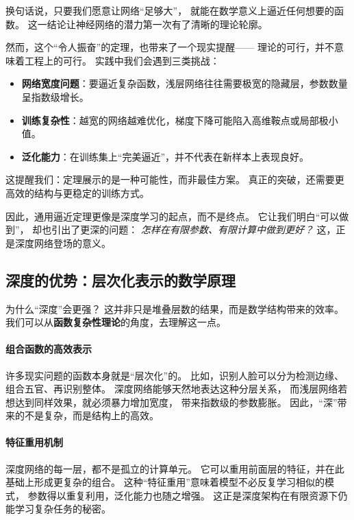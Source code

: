 换句话说，只要我们愿意让网络“足够大”，  
就能在数学意义上逼近任何想要的函数。  
这一结论让神经网络的潜力第一次有了清晰的理论轮廓。

然而，这个“令人振奋”的定理，也带来了一个现实提醒——  
理论的可行，并不意味着工程上的可行。  
实践中我们会遇到三类挑战：

\begin{itemize}
\item \textbf{网络宽度问题}：要逼近复杂函数，浅层网络往往需要极宽的隐藏层，参数数量呈指数级增长。
\item \textbf{训练复杂性}：越宽的网络越难优化，梯度下降可能陷入高维鞍点或局部极小值。
\item \textbf{泛化能力}：在训练集上“完美逼近”，并不代表在新样本上表现良好。
\end{itemize}

这提醒我们：定理展示的是一种可能性，而非最佳方案。  
真正的突破，还需要更高效的结构与更稳定的训练方式。

因此，通用逼近定理更像是深度学习的起点，而不是终点。  
它让我们明白“可以做到”，  
却也引出了更深的问题：  
\textit{怎样在有限参数、有限计算中做到更好？}  
这，正是深度网络登场的意义。

\subsection{深度的优势：层次化表示的数学原理}

为什么“深度”会更强？  
这并非只是堆叠层数的结果，而是数学结构带来的效率。  
我们可以从\textbf{函数复杂性理论}的角度，去理解这一点。

\paragraph{组合函数的高效表示}  
许多现实问题的函数本身就是“层次化”的。  
比如，识别人脸可以分为检测边缘、组合五官、再识别整体。  
深度网络能够天然地表达这种分层关系，  
而浅层网络若想达到同样效果，就必须暴力增加宽度，  
带来指数级的参数膨胀。  
因此，“深”带来的不是复杂，而是结构上的高效。  

\paragraph{特征重用机制}  
深度网络的每一层，都不是孤立的计算单元。  
它可以重用前面层的特征，并在此基础上形成更复杂的组合。  
这种“特征重用”意味着模型不必反复学习相似的模式，  
参数得以重复利用，泛化能力也随之增强。  
这正是深度架构在有限资源下仍能学习复杂任务的秘密。  

